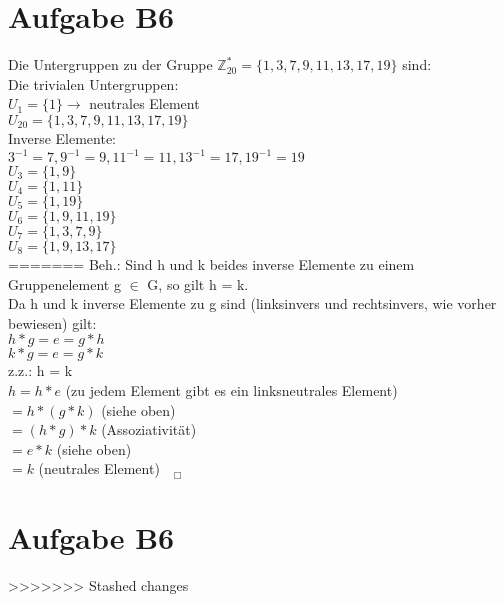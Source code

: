 \documentclass[11pt,a4paper]{article}
\begin{document}
\section*{Aufgabe B6}
Die Untergruppen zu der Gruppe $\mathbb{Z}^{*}_{20} = \{1,3,7,9,11,13,17,19\}$ sind:\\
Die trivialen Untergruppen:\\
$U_1 =\{1\} \longrightarrow$ neutrales Element\\
$U_20 = \{1,3,7,9,11,13,17,19\}$\\
Inverse Elemente:\\
$3^{-1}=7, 9^{-1}=9, 11^{-1}=11, 13^{-1}=17, 19^{-1}=19$\\
$U_3=\{1,9\}$\\
$U_4=\{1,11\}$\\
$U_5=\{1,19\}$\\
$U_6=\{1,9,11,19\}$\\
$U_7=\{1,3,7,9\}$\\
$U_8=\{1,9,13,17\}$\\
=======
Beh.: Sind h und k beides inverse Elemente zu einem Gruppenelement g $\in$ G, so gilt h = k. \\

Da h und k inverse Elemente zu g sind (linksinvers und rechtsinvers, wie vorher bewiesen) gilt: \\
$ h \ast  g = e = g \ast  h$ \\
$ k \ast  g = e = g \ast  k$  \\

z.z.: h = k \\
$h = h \ast e$   (zu jedem Element gibt es ein linksneutrales Element) \\
$= h \ast (g \ast k)$    (siehe oben) \\
$= (h \ast g) \ast k$    (Assoziativität) \\
$= e \ast k$      (siehe oben) \\
$=k$       (neutrales Element) $~~~_\Box$ \\

\section*{Aufgabe B6}

>>>>>>> Stashed changes
\end{document}
